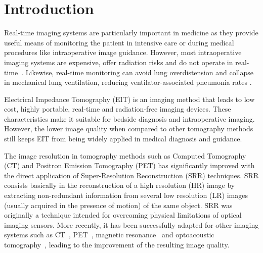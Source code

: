 \documentclass[10pt]{IEEEtran}
\newcommand{\cred}{}
\newcommand{\cblue}{}
\newcommand{\cgray}{\textcolor[gray]{0.5}}
\begin{document}




\section{Introduction}


Real-time imaging systems are particularly important in medicine as they provide useful means of monitoring the patient in intensive care or during medical procedures like intraoperative image guidance.
%
However, most intraoperative imaging systems are expensive, offer radiation risks and do not operate in real-time~\cite{Helm2015}.
%
Likewise, real-time monitoring can avoid lung overdistension and collapse in mechanical lung ventilation, reducing ventilator-associated pneumonia rates \cite{Holder04}.




Electrical Impedance Tomography (EIT) is an imaging method that leads to low cost, highly portable, real-time and radiation-free imaging devices. These characteristics make it suitable for bedside diagnosis and intraoperative imaging. However, the lower image quality when compared to other tomography methods still keeps EIT from being widely applied in medical diagnosis and guidance.





The image resolution in tomography methods such as Computed Tomography (CT) and Positron Emission Tomography (PET) has significantly improved with the direct application of Super-Resolution Reconstruction (SRR) techniques. SRR consists basically in the reconstruction of a high resolution (HR) image by extracting non-redundant information from several low resolution (LR) images (usually acquired in the presence of motion) of the same object. SRR was originally a technique intended for overcoming physical limitations of optical imaging sensors. More recently, it has been successfully adapted for other imaging systems \cred{such as CT~\cite{Kennedy06}, PET~\cite{wallach2012PET_SRR}, magnetic resonance~\cite{shi2015MR_SRR} and optoacoustic tomography~\cite{he2016optoacoustic_SRR}, leading to the improvement of the resulting image quality.}
\end{document}

